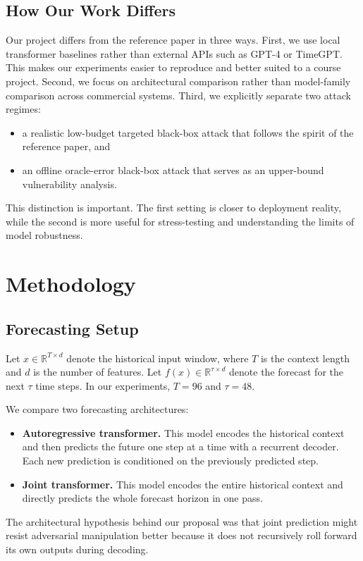 \documentclass[11pt]{article}
\begin{document}
\subsection{How Our Work Differs}
Our project differs from the reference paper in three ways. First, we use local transformer baselines rather than external APIs such as GPT-4 or TimeGPT. This makes our experiments easier to reproduce and better suited to a course project. Second, we focus on architectural comparison rather than model-family comparison across commercial systems. Third, we explicitly separate two attack regimes:
\begin{itemize}
  \item a realistic low-budget targeted black-box attack that follows the spirit of the reference paper, and
  \item an offline oracle-error black-box attack that serves as an upper-bound vulnerability analysis.
\end{itemize}

This distinction is important. The first setting is closer to deployment reality, while the second is more useful for stress-testing and understanding the limits of model robustness.

\section{Methodology}
\subsection{Forecasting Setup}
Let $x \in \mathbb{R}^{T \times d}$ denote the historical input window, where $T$ is the context length and $d$ is the number of features. Let $f(x) \in \mathbb{R}^{\tau \times d}$ denote the forecast for the next $\tau$ time steps. In our experiments, $T=96$ and $\tau=48$.

We compare two forecasting architectures:
\begin{itemize}
  \item \textbf{Autoregressive transformer.} This model encodes the historical context and then predicts the future one step at a time with a recurrent decoder. Each new prediction is conditioned on the previously predicted step.
  \item \textbf{Joint transformer.} This model encodes the entire historical context and directly predicts the whole forecast horizon in one pass.
\end{itemize}

The architectural hypothesis behind our proposal was that joint prediction might resist adversarial manipulation better because it does not recursively roll forward its own outputs during decoding.
\end{document}
